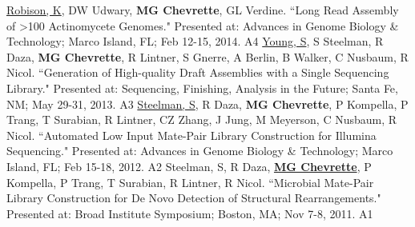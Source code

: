\begin{cvpubs}
  \cvpub
    {\underline{Robison, K}, DW Udwary, \textbf{MG Chevrette}, GL Verdine. ``Long Read Assembly of >100 Actinomycete Genomes." Presented at: Advances in Genome Biology \& Technology; Marco Island, FL; Feb 12-15, 2014.} %
    {A4} %
  \cvpub
    {\underline{Young, S}, S Steelman, R Daza, \textbf{MG Chevrette}, R Lintner, S Gnerre, A Berlin, B Walker, C Nusbaum, R Nicol. ``Generation of High-quality Draft Assemblies with a Single Sequencing Library." Presented at: Sequencing, Finishing, Analysis in the Future; Santa Fe, NM; May 29-31, 2013.} %
    {A3} %
  \cvpub
    {\underline{Steelman, S}, R Daza, \textbf{MG Chevrette}, P Kompella, P Trang, T Surabian, R Lintner, CZ Zhang, J Jung, M Meyerson, C Nusbaum, R Nicol. ``Automated Low Input Mate-Pair Library Construction for Illumina Sequencing." Presented at: Advances in Genome Biology \& Technology; Marco Island, FL; Feb 15-18, 2012.} %
    {A2} %
  \cvpub
    {Steelman, S, R Daza, \underline{\textbf{MG Chevrette}}, P Kompella, P Trang, T Surabian, R Lintner, R Nicol. ``Microbial Mate-Pair Library Construction for De Novo Detection of Structural Rearrangements." Presented at: Broad Institute Symposium; Boston, MA; Nov 7-8, 2011.} %
    {A1} %
\end{cvpubs}